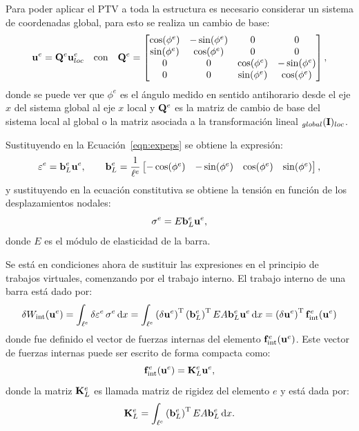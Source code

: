 Para poder aplicar el PTV a toda la estructura es necesario considerar un sistema de coordenadas global, para esto se realiza un cambio de base:
%
\begin{equation}
{\bf u}^e = {\bf Q}^e {\bf u}^e_{loc} \quad \text{con} \quad {\bf Q}^e = \left[
\begin{matrix}
\cos(\phi^e) & -\sin(\phi^e) & 0 & 0 \\
\sin(\phi^e)  & \cos(\phi^e) & 0 & 0 \\
0  & 0 & \cos(\phi^e) &-\sin(\phi^e) \\
0  & 0 & \sin(\phi^e) & \cos(\phi^e) \\
\end{matrix}\right],
\end{equation}
%
donde se puede ver que $\phi^e$ es el ángulo medido en sentido antihorario desde el eje $x$ del sistema global al eje $x$ local y ${\bf Q}^e$ es la matriz de cambio de base del sistema local al global o la matriz asociada a la transformación lineal $_{global}({\bf I})_{loc}$.


Sustituyendo en la Ecuación~\eqref{eqn:expeps} se obtiene la expresión:
%
\begin{equation}\label{eqn:exprepslin}
\varepsilon^e =  {\bf b}_L^e {\bf u}^e,
\qquad
{\bf b}_L^e = \frac{1}{\ell^e} \left[ \begin{matrix}
-\cos(\phi^e) & -\sin(\phi^e) & \cos(\phi^e) & \sin(\phi^e)
\end{matrix} \right],
\end{equation}
%
y sustituyendo en la ecuación constitutiva se obtiene la tensión en función de los desplazamientos nodales:
%
\begin{equation}
\sigma^e = E {\bf b}_L^e {\bf u}^e,
\end{equation}
donde $E$ es el módulo de elasticidad de la barra. %
%

Se está en condiciones ahora de sustituir las expresiones en el principio de trabajos virtuales, comenzando por el trabajo interno. El trabajo interno de una barra está dado por:
%
\begin{equation}
\delta W_{\text{int}}(\bfu^e) %
= \int_{\ell^e}  \delta \varepsilon^e \, \sigma^e \, \dif x %
%
= \int_{\ell^e} \left( \delta \bfu^e\right)^{\text{T}} \left( \bfb_L^e\right)^{\text{T}} E A \bfb_L^e \bfu^e \, \dif x  %
%
= \left( \delta \bfu^e \right)^{\text{T}} \bff^e_{\text{int}}(\bfu^e) 
\end{equation}
%
donde fue definido el vector de fuerzas internas del elemento ${\bf f}^e_{\text{int}}({\bf u}^e)$. %
%
Este vector de fuerzas internas puede ser escrito de forma compacta como:
%
\begin{equation}
{\bf f}^e_{\text{int}} ({\bf u}^e) = {\bf K}_L^e {\bf u}^e,
\end{equation}
%
donde la matriz ${\bf K}^e_L$ es llamada matriz de rigidez del elemento $e$ y está dada por:
%
\begin{equation}
{\bf K}_L^e = \int_{\ell^e} \left( {\bf b}_L^e\right)^{\text{T}} E A {\bf b}_L^e \, {\text{d}} x.
\end{equation}
%

